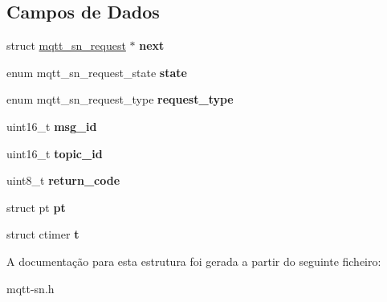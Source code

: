 \subsection*{Campos de Dados}
\begin{DoxyCompactItemize}
\item 
\hypertarget{structmqtt__sn__request_a20d0cb4f347464cad0635ed82a559f88}{struct \hyperlink{structmqtt__sn__request}{mqtt\+\_\+sn\+\_\+request} $\ast$ {\bfseries next}}\label{structmqtt__sn__request_a20d0cb4f347464cad0635ed82a559f88}

\item 
\hypertarget{structmqtt__sn__request_a321b0cbd90ae21d6841c6c172fc2e31d}{enum mqtt\+\_\+sn\+\_\+request\+\_\+state {\bfseries state}}\label{structmqtt__sn__request_a321b0cbd90ae21d6841c6c172fc2e31d}

\item 
\hypertarget{structmqtt__sn__request_aa70d371444c7df8d27c1e935208acf46}{enum mqtt\+\_\+sn\+\_\+request\+\_\+type {\bfseries request\+\_\+type}}\label{structmqtt__sn__request_aa70d371444c7df8d27c1e935208acf46}

\item 
\hypertarget{structmqtt__sn__request_a689014fc11d4f26d264ddae2eaebc9d8}{uint16\+\_\+t {\bfseries msg\+\_\+id}}\label{structmqtt__sn__request_a689014fc11d4f26d264ddae2eaebc9d8}

\item 
\hypertarget{structmqtt__sn__request_ad562f54acc5597130e0710c356963dff}{uint16\+\_\+t {\bfseries topic\+\_\+id}}\label{structmqtt__sn__request_ad562f54acc5597130e0710c356963dff}

\item 
\hypertarget{structmqtt__sn__request_aa72e4a685c5a553897adf56e0e60a61e}{uint8\+\_\+t {\bfseries return\+\_\+code}}\label{structmqtt__sn__request_aa72e4a685c5a553897adf56e0e60a61e}

\item 
\hypertarget{structmqtt__sn__request_af04269db7f30a16bc4016d3b2ae134d5}{struct pt {\bfseries pt}}\label{structmqtt__sn__request_af04269db7f30a16bc4016d3b2ae134d5}

\item 
\hypertarget{structmqtt__sn__request_a7bd0b9445da7f97483e5fc042ac029da}{struct ctimer {\bfseries t}}\label{structmqtt__sn__request_a7bd0b9445da7f97483e5fc042ac029da}

\end{DoxyCompactItemize}


A documentação para esta estrutura foi gerada a partir do seguinte ficheiro\+:\begin{DoxyCompactItemize}
\item 
mqtt-\/sn.\+h\end{DoxyCompactItemize}
